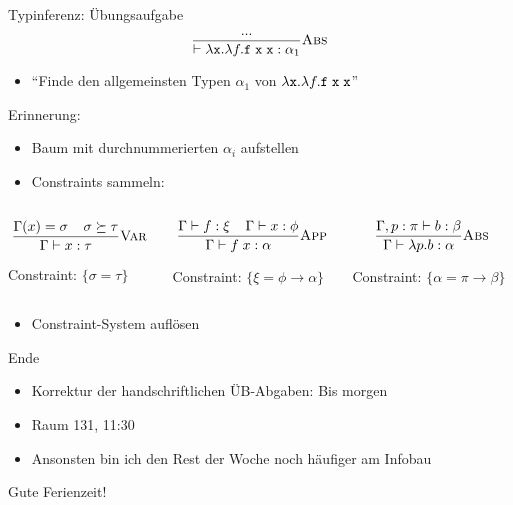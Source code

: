 \documentclass{beamer}
\begin{document}
\begin{frame}{Typinferenz: Übungsaufgabe}
	\begin{equation*}
		\typeRule{Abs}{
			...
		}{
			\vdash \abs{\texttt{x}}{\abs{f}{\liiin{\texttt{f}}{\texttt{x}}{\texttt{x}}}} : \alpha_1
		}
	\end{equation*}

	\begin{itemize}
		\item \enquote{Finde den allgemeinsten Typen $\alpha_1$ von $\abs{\texttt{x}}{\abs{f}{\liiin{\texttt{f}}{\texttt{x}}{\texttt{x}}}}$}
	\end{itemize}

	Erinnerung:

	\begin{itemize}
		\item Baum mit durchnummerierten $\alpha_i$ aufstellen
		\item Constraints sammeln:
	\end{itemize}

	\begin{columns}
		\scriptsize
		\begin{column}{0.3\textwidth}
			\begin{equation*}
			\typeRule{Var}{
				\Gamma(x) = \sigma
				\;\;\;\;
				\sigma \succeq \tau
			}{
				\Gamma \vdash x : \tau
			}
			\end{equation*}

			Constraint: $\{ \sigma = \tau \}$
		\end{column}
		\begin{column}{0.3\textwidth}
			\begin{equation*}
			\typeRule{App}{
				\Gamma \vdash f : \xi
				\;\;\;\;
				\Gamma \vdash x : \phi
			}{
				\Gamma \vdash \liin{f}{x} : \alpha
			}
			\end{equation*}

			Constraint: $\{ \xi = \phi \to \alpha \}$
		\end{column}
		\begin{column}{0.3\textwidth}
			\begin{equation*}
			\typeRule{Abs}{
				\Gamma, p : \pi \vdash b : \beta
			}{
				\Gamma \vdash \abs{p}{b} : \alpha
			}
			\end{equation*}

			Constraint: $\{ \alpha = \pi \to \beta \}$
		\end{column}
	\end{columns}

	\begin{itemize}
		\item Constraint-System auflösen
	\end{itemize}
\end{frame}

\begin{frame}{Ende}
	\begin{itemize}
		\item Korrektur der handschriftlichen ÜB-Abgaben: Bis morgen
		\item Raum 131, 11:30
		\item Ansonsten bin ich den Rest der Woche noch häufiger am Infobau
	\end{itemize}

	Gute Ferienzeit!
\end{frame}
\end{document}
